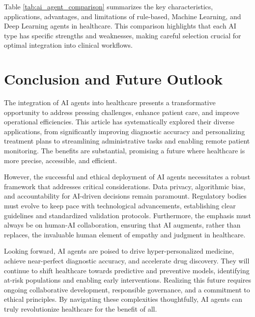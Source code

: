 \documentclass[12pt,a4paper]{article}
\begin{document}
Table \ref{tab:ai_agent_comparison} summarizes the key characteristics, applications, advantages, and limitations of rule-based, Machine Learning, and Deep Learning agents in healthcare. This comparison highlights that each AI type has specific strengths and weaknesses, making careful selection crucial for optimal integration into clinical workflows.

\section{Conclusion and Future Outlook}
The integration of AI agents into healthcare presents a transformative opportunity to address pressing challenges, enhance patient care, and improve operational efficiencies. This article has systematically explored their diverse applications, from significantly improving diagnostic accuracy and personalizing treatment plans to streamlining administrative tasks and enabling remote patient monitoring. The benefits are substantial, promising a future where healthcare is more precise, accessible, and efficient.

However, the successful and ethical deployment of AI agents necessitates a robust framework that addresses critical considerations. Data privacy, algorithmic bias, and accountability for AI-driven decisions remain paramount. Regulatory bodies must evolve to keep pace with technological advancements, establishing clear guidelines and standardized validation protocols. Furthermore, the emphasis must always be on human-AI collaboration, ensuring that AI augments, rather than replaces, the invaluable human element of empathy and judgment in healthcare.

Looking forward, AI agents are poised to drive hyper-personalized medicine, achieve near-perfect diagnostic accuracy, and accelerate drug discovery. They will continue to shift healthcare towards predictive and preventive models, identifying at-risk populations and enabling early interventions. Realizing this future requires ongoing collaborative development, responsible governance, and a commitment to ethical principles. By navigating these complexities thoughtfully, AI agents can truly revolutionize healthcare for the benefit of all.

\printbibliography[heading=bibintoc]
\end{document}
